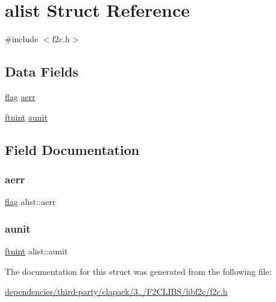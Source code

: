 \hypertarget{structalist}{}\section{alist Struct Reference}
\label{structalist}


{\ttfamily \#include $<$f2c.\+h$>$}

\subsection*{Data Fields}
\begin{DoxyCompactItemize}
\item 
\hyperlink{dependencies_2third-party_2clapack_23_82_81_2_f2_c_l_i_b_s_2libf2c_2f2c_8h_abf5d144da384425ae6cb542ce6eec8d3}{flag} \hyperlink{structalist_af470841413f5853794fa9830d1e71ecd}{aerr}
\item 
\hyperlink{dependencies_2third-party_2clapack_23_82_81_2_f2_c_l_i_b_s_2libf2c_2f2c_8h_a9d70cdb573fb2bf020e1f6dba85fb1cc}{ftnint} \hyperlink{structalist_a02749fb381f7642c1d5d01902817f673}{aunit}
\end{DoxyCompactItemize}


\subsection{Field Documentation}
\mbox{\label{structalist_af470841413f5853794fa9830d1e71ecd}} 
\subsubsection{\texorpdfstring{aerr}{aerr}}
{\footnotesize\ttfamily \hyperlink{dependencies_2third-party_2clapack_23_82_81_2_f2_c_l_i_b_s_2libf2c_2f2c_8h_abf5d144da384425ae6cb542ce6eec8d3}{flag} alist\+::aerr}

\mbox{\label{structalist_a02749fb381f7642c1d5d01902817f673}} 
\subsubsection{\texorpdfstring{aunit}{aunit}}
{\footnotesize\ttfamily \hyperlink{dependencies_2third-party_2clapack_23_82_81_2_f2_c_l_i_b_s_2libf2c_2f2c_8h_a9d70cdb573fb2bf020e1f6dba85fb1cc}{ftnint} alist\+::aunit}



The documentation for this struct was generated from the following file\+:\begin{DoxyCompactItemize}
\item 
\hyperlink{dependencies_2third-party_2clapack_23_82_81_2_f2_c_l_i_b_s_2libf2c_2f2c_8h}{dependencies/third-\/party/clapack/3../\+F2\+C\+L\+I\+B\+S/libf2c/f2c.\+h}\end{DoxyCompactItemize}
